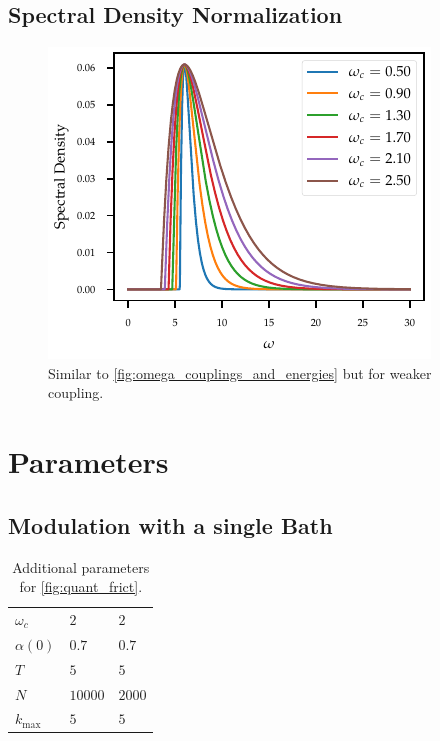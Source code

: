 \subsection{Spectral Density Normalization}
\label{sec:spec_densities}
\begin{figure}[h]
  \centering
  \includegraphics{figs/one_bath_mod/omega_sd_weak}
  \caption{\label{fig:omega_couplings_weak} Similar
    to \cref{fig:omega_couplings_and_energies} but for weaker coupling.}
\end{figure}



\section{Parameters}
\label{sec:plus_params}

\subsection{Modulation with a single Bath}
\label{sec:plus_mod_single}

\begin{table}
  \centering
  \begin{tabular}{lll}
    \hline
    $ω_c$              & $2$     & $2$    \\
    $α(0)$             & $0.7$   & $0.7$  \\
    $T$                & $5$     & $5$    \\
    $N$                & $10000$ & $2000$ \\
    $k_{\mathrm{max}}$ & $5$     & $5$    \\
    \hline
  \end{tabular}
  \caption{\label{tab:plus_friction}Additional parameters for
    \cref{fig:quant_frict}.}
\end{table}


